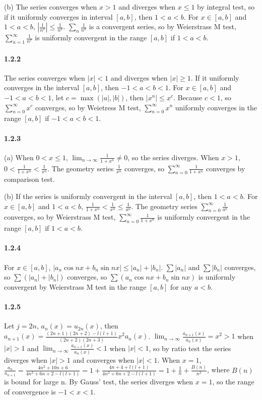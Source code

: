 \documentclass[a4paper]{article}
\begin{document}
(b) The series converges when $x>1$ and diverges when $x\leq 1$ by integral test, so if it uniformly converges in interval $[a,b]$, then $1<a<b$.
For $x\in[a,b]$ and $1<a<b$,
$|\frac{1}{n^x}|\leq\frac{1}{n^a}$. $\sum_n \frac{1}{n^a}$ is a convergent series, so by Weierstrass M test,  $\sum_{n=1}^\infty\frac{1}{n^x}$ is uniformly convergent in the range $[a,b]$ if $1<a<b$.

\paragraph{1.2.2}
The series converges when $|x|<1$ and diverges when $|x|\geq1$. If it uniformly converges in the interval $[a,b]$, then $-1<a<b<1$. For $x\in [a,b]$ and $-1<a<b<1$, let $c=\max(|a|,|b|)$, then $|x^n|\leq x^c$. Because $c<1$, so $\sum_{n=0}^\infty x^c$ converges, so by Weietress M test, $\sum_{n=0}^\infty x^n$ uniformly converges in the range $[a,b]$ if $-1<a<b<1$. 

\paragraph{1.2.3}
(a) When $0<x\leq1$, $\lim_{n\to\infty}\frac{1}{1+x^n}\neq0$, so the series diverges. When $x>1$, $0<\frac{1}{1+x^n}<\frac{1}{x^n}$. The geometry series $\frac{1}{x^n}$ converges, so $\sum_{n=0}^\infty\frac{1}{1+x^n}$ converges by comparison test.

(b) If the series is uniformly convergent in the interval $[a,b]$, then $1<a<b$. For $x\in [a,b]$ and $1<a<b$, $\frac{1}{1+x^n}<\frac{1}{x^n}\leq\frac{1}{a^n}$. The geometry series $\sum_{n=0}^\infty\frac{1}{a^n}$ converges, so by Weierstrass M test, $\sum_{n=0}^\infty\frac{1}{1+x^n}$ is uniformly convergent in the range $[a,b]$ if $1<a<b$.

\paragraph{1.2.4}
For $x\in[a,b]$, $|a_n\cos nx+b_n\sin nx|\leq|a_n|+|b_n|$. $\sum |a_n|$ and $\sum |b_n|$ converges, so $\sum(|a_n|+|b_n|)$ converges, so $\sum(a_n\cos nx+b_n\sin nx)$ is uniformly convergent by Weierstrass M test in the range $[a,b]$ for any $a<b$.

\paragraph{1.2.5}
Let $j=2n$, $a_n(x)=u_{2n}(x)$, then $a_{n+1}(x)=\frac{(2n+1)(2n+2)-l(l+1)}{(2n+2)(2n+3)}x^2a_n(x)$.
$\lim_{n\to\infty}\frac{a_{n+1}(x)}{a_n(x)}=x^2>1$ when $|x|>1$ and $\lim_{n\to\infty}\frac{a_{n+1}(x)}{a_n(x)}<1$ when $|x|<1$, so by ratio test the series diverges when $|x|>1$ and converges when $|x|<1$. When $x=1$, $\frac{a_n}{a_{n+1}}=\frac{4n^2+10n+6}{4n^2+6n+2-l(l+1)}=1+\frac{4n+4+l(l+1)}{4n^2+6n+2-l(l+1)}=1+\frac{1}{n}+\frac{B(n)}{n^2}$, where $B(n)$ is bound for large n. By Gauss' test, the series diverges when $x=1$, so the range of convergence is $-1<x<1$.
\end{document}
